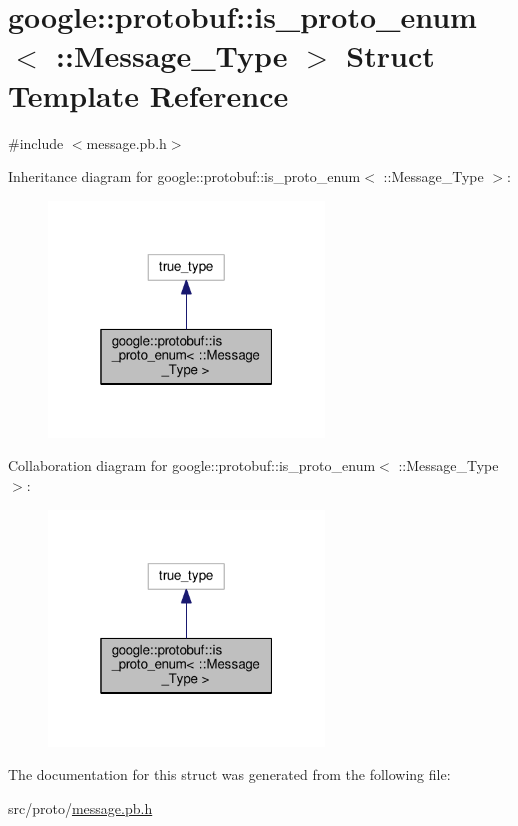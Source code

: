 \hypertarget{structgoogle_1_1protobuf_1_1is__proto__enum_3_01_1_1_message___type_01_4}{}\section{google\+:\+:protobuf\+:\+:is\+\_\+proto\+\_\+enum$<$ \+:\+:Message\+\_\+\+Type $>$ Struct Template Reference}
\label{structgoogle_1_1protobuf_1_1is__proto__enum_3_01_1_1_message___type_01_4}


{\ttfamily \#include $<$message.\+pb.\+h$>$}



Inheritance diagram for google\+:\+:protobuf\+:\+:is\+\_\+proto\+\_\+enum$<$ \+:\+:Message\+\_\+\+Type $>$\+:
\nopagebreak
\begin{figure}[H]
\begin{center}
\leavevmode
\includegraphics[width=208pt]{structgoogle_1_1protobuf_1_1is__proto__enum_3_01_1_1_message___type_01_4__inherit__graph}
\end{center}
\end{figure}


Collaboration diagram for google\+:\+:protobuf\+:\+:is\+\_\+proto\+\_\+enum$<$ \+:\+:Message\+\_\+\+Type $>$\+:
\nopagebreak
\begin{figure}[H]
\begin{center}
\leavevmode
\includegraphics[width=208pt]{structgoogle_1_1protobuf_1_1is__proto__enum_3_01_1_1_message___type_01_4__coll__graph}
\end{center}
\end{figure}


The documentation for this struct was generated from the following file\+:\begin{DoxyCompactItemize}
\item 
src/proto/\hyperlink{message_8pb_8h}{message.\+pb.\+h}\end{DoxyCompactItemize}
